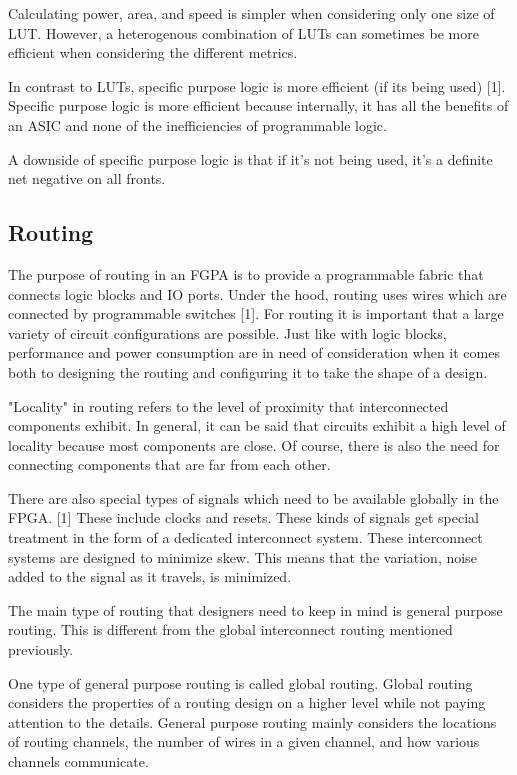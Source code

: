 \documentclass{article}
\begin{document}
    Calculating power, area, and speed is simpler when considering only
    one size of LUT. However, a heterogenous combination of LUTs can sometimes
    be more efficient when considering the different metrics.

    In contrast to LUTs, specific purpose logic is more efficient (if its being used) [1].
    Specific purpose logic is more efficient because internally, it
    has all the benefits of an ASIC and none of the inefficiencies of programmable logic.

    A downside of specific purpose logic is that if it's not being used, it's
    a definite net negative on all fronts.
    
    \subsection{Routing}

    The purpose of routing in an FGPA is to provide a programmable fabric that connects
    logic blocks and IO ports. Under the hood, routing uses wires which are connected
    by programmable switches [1]. For routing it is important that a large variety
    of circuit configurations are possible. Just like with logic blocks, performance
    and power consumption are in need of consideration when it comes both to designing
    the routing and configuring it to take the shape of a design.

    "Locality" in routing refers to the level of proximity that interconnected components
    exhibit. In general, it can be said that circuits exhibit a high level of locality
    because most components are close. Of course, there is also the need for connecting
    components that are far from each other.

    There are also special types of signals which need to be available globally
    in the FPGA. [1] These include clocks and resets. These kinds of signals get
    special treatment in the form of a dedicated interconnect system. These
    interconnect systems are designed to minimize skew. This means that the
    variation, noise added to the signal as it travels, is minimized.

    The main type of routing that designers need to keep in mind is
    general purpose routing. This is different from the global interconnect routing
    mentioned previously.
    
    One type of general purpose routing is called global routing. Global routing
    considers the properties of a routing design on a higher level while not paying attention
    to the details. General purpose routing mainly considers the locations of routing
    channels, the number of wires in a given channel, and how various channels communicate.
\end{document}
